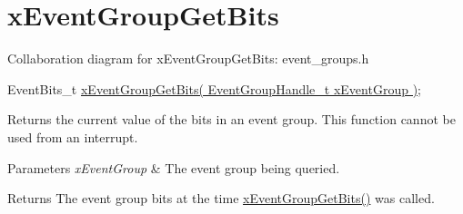 \hypertarget{group__x_event_group_get_bits}{}\section{x\+Event\+Group\+Get\+Bits}
\label{group__x_event_group_get_bits}
Collaboration diagram for x\+Event\+Group\+Get\+Bits\+:
event\+\_\+groups.\+h 
\begin{DoxyPre}
 EventBits\_t \hyperlink{externals_2freertos_2include_2event__groups_8h_a0ae86f092fb07ccb475ae938f9a12584}{xEventGroupGetBits( EventGroupHandle\_t xEventGroup )};
\end{DoxyPre}


Returns the current value of the bits in an event group. This function cannot be used from an interrupt.


\begin{DoxyParams}{Parameters}
{\em x\+Event\+Group} & The event group being queried.\\
\hline
\end{DoxyParams}
\begin{DoxyReturn}{Returns}
The event group bits at the time \hyperlink{externals_2freertos_2include_2event__groups_8h_a0ae86f092fb07ccb475ae938f9a12584}{x\+Event\+Group\+Get\+Bits()} was called. 
\end{DoxyReturn}
